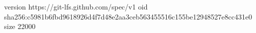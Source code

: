 version https://git-lfs.github.com/spec/v1
oid sha256:c5981b6fbd9618926d4f7d48e2aa3ceb563455516c155be12948527e8cc431e0
size 22000
